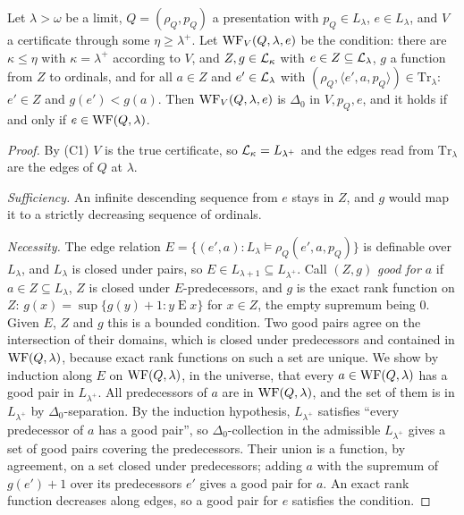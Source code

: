 \documentclass[11pt]{article}
\begin{document}
\begin{statement} Let $\lambda > \omega$ be a limit, $Q = (\rho_Q, p_Q)$
a presentation with $p_Q \in L_\lambda$, $e \in L_\lambda$, and $V$ a certificate through some $\eta \ge \lambda^+$.
Let $\mathrm{WF}_V(Q, \lambda, e)$ be the condition: there are $\kappa \le \eta$ with $\kappa = \lambda^+$ according to $V$,
and $Z, g \in \mathcal{L}_\kappa$ with $e \in Z \subseteq \mathcal{L}_\lambda$, $g$ a function from $Z$ to ordinals, and for all $a \in
Z$ and $e' \in \mathcal{L}_\lambda$ with $(\rho_Q, \langle e', a, p_Q\rangle) \in \mathrm{Tr}_\lambda$: $e' \in Z$ and $g(e')
< g(a)$. Then $\mathrm{WF}_V(Q,\lambda,e)$ is $\Delta_0$ in $V, p_Q, e$, and it holds if and only if $e \in \mathrm{WF}(Q, \lambda)$.
\end{statement}

\begin{proof}
By (C1) $V$ is the true certificate, so $\mathcal{L}_\kappa = L_{\lambda^+}$ and the edges read from $\mathrm{Tr}_\lambda$ are
the edges of $Q$ at $\lambda$.

\emph{Sufficiency.} An infinite descending sequence from $e$ stays in $Z$, and $g$ would map it to a strictly
decreasing sequence of ordinals.

\emph{Necessity.} The edge relation $E = \{(e', a) : L_\lambda \models \rho_Q(e', a, p_Q)\}$ is definable over
$L_\lambda$, and $L_\lambda$ is closed under pairs, so $E \in L_{\lambda+1} \subseteq L_{\lambda^+}$. Call $(Z, g)$
\emph{good for $a$} if $a \in Z \subseteq L_\lambda$, $Z$ is closed under $E$-predecessors, and $g$ is the exact rank
function on $Z$: $g(x) = \sup\{g(y) + 1 : y \mathrel{E} x\}$ for $x \in Z$, the empty supremum being $0$. Given $E$, $Z$
and $g$ this is a bounded condition. Two good pairs agree on the intersection of their domains, which is closed under
predecessors and contained in $\mathrm{WF}(Q,\lambda)$, because exact rank functions on such a set are unique. We show by
induction along $E$ on $\mathrm{WF}(Q, \lambda)$, in the universe, that every $a \in \mathrm{WF}(Q,\lambda)$ has a good pair in
$L_{\lambda^+}$. All predecessors of $a$ are in $\mathrm{WF}(Q,\lambda)$, and the set of them is in $L_{\lambda^+}$ by
$\Delta_0$-separation. By the induction hypothesis, $L_{\lambda^+}$ satisfies ``every predecessor of $a$ has a good
pair'', so $\Delta_0$-collection in the admissible $L_{\lambda^+}$ gives a set of good pairs covering the predecessors.
Their union is a function, by agreement, on a set closed under predecessors; adding $a$ with the supremum of $g(e') + 1$
over its predecessors $e'$ gives a good pair for $a$. An exact rank function decreases along edges, so a good pair for
$e$ satisfies the condition.
\end{proof}
\end{document}
